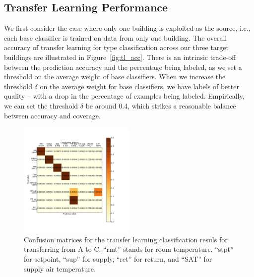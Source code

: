 \subsection{Transfer Learning Performance}

We first consider the case where only one building is exploited as the source, i.e., each base classifier is trained on data from only one building. 
The overall accuracy of transfer learning for type classification across our three target buildings are illustrated in Figure~\ref{fig:tl_acc}.
There is an intrinsic trade-off between the prediction accuracy and the percentage being labeled, as we set a threshold on the average weight of base classifiers. 
When we increase the threshold $\delta$ on the average weight for base classifiers, we have labels of better quality -- with a drop in the percentage of examples being labeled. 
Empirically, we can set the threshold $\delta$ be around 0.4, which strikes a reasonable balance between accuracy and coverage.

\begin{figure}[ht!]
                \centering
    \includegraphics[width=0.5\textwidth]{./fig/cm_single}
\caption{Confusion matrices for the transfer learning classification resuls for transferring from A to C. ``rmt'' stands for room temperature, ``stpt'' for setpoint, ``sup'' for supply, ``ret'' for return, and ``SAT'' for supply air temperature.
 }
\label{fig_cm}
\end{figure}

